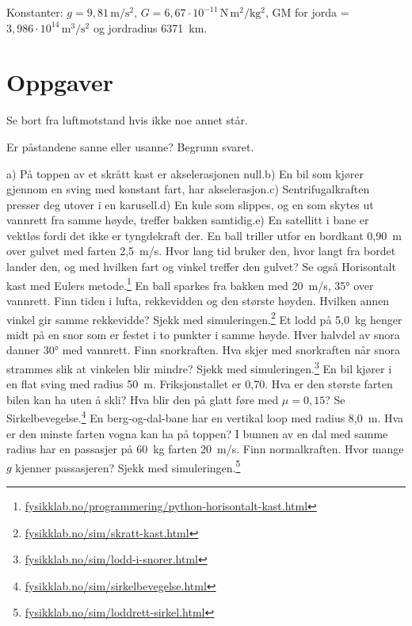 \documentclass[11pt]{article}
\begin{document}
Konstanter: $g = 9{,}81\,\mathrm{m/s^{2}}$, $G = 6{,}67 \cdot 10^{-11}\,\mathrm{N\,m^{2}/kg^{2}}$, GM for jorda = $3{,}986 \cdot 10^{14}\,\mathrm{m^{3}/s^{2}}$ og jordradius 6371~km.

\section*{Oppgaver}

Se bort fra luftmotstand hvis ikke noe annet står.

\begin{oppgaveliste}
\oppgave {}Er påstandene sanne eller usanne? Begrunn svaret.

a) På toppen av et skrått kast er akselerasjonen null.\newline b) En bil som kjører gjennom en sving med konstant fart, har akselerasjon.\newline c) Sentrifugalkraften presser deg utover i en karusell.\newline d) En kule som slippes, og en som skytes ut vannrett fra samme høyde, treffer bakken samtidig.\newline e) En satellitt i bane er vektløs fordi det ikke er tyngdekraft der.
\svar
\oppgave {}En ball triller utfor en bordkant 0,90~m over gulvet med farten 2,5~m/s. Hvor lang tid bruker den, hvor langt fra bordet lander den, og med hvilken fart og vinkel treffer den gulvet? Se også Horisontalt kast med Eulers metode.\footnote{\url{fysikklab.no/programmering/python-horisontalt-kast.html}}
\svar
\oppgave {}En ball sparkes fra bakken med 20~m/s, 35° over vannrett. Finn tiden i lufta, rekkevidden og den største høyden. Hvilken annen vinkel gir samme rekkevidde? Sjekk med simuleringen.\footnote{\url{fysikklab.no/sim/skratt-kast.html}}
\svar
\oppgave {}Et lodd på 5,0~kg henger midt på en snor som er festet i to punkter i samme høyde. Hver halvdel av snora danner 30° med vannrett. Finn snorkraften. Hva skjer med snorkraften når snora strammes slik at vinkelen blir mindre? Sjekk med simuleringen.\footnote{\url{fysikklab.no/sim/lodd-i-snorer.html}}
\svar
\oppgave {}En bil kjører i en flat sving med radius 50~m. Friksjonstallet er 0,70. Hva er den største farten bilen kan ha uten å skli? Hva blir den på glatt føre med $μ = 0{,}15$? Se Sirkelbevegelse.\footnote{\url{fysikklab.no/sim/sirkelbevegelse.html}}
\svar
\oppgave {}En berg-og-dal-bane har en vertikal loop med radius 8,0~m. Hva er den minste farten vogna kan ha på toppen? I bunnen av en dal med samme radius har en passasjer på 60~kg farten 20~m/s. Finn normalkraften. Hvor mange $g$ kjenner passasjeren? Sjekk med simuleringen.\footnote{\url{fysikklab.no/sim/loddrett-sirkel.html}}

\end{oppgaveliste}
\end{document}
